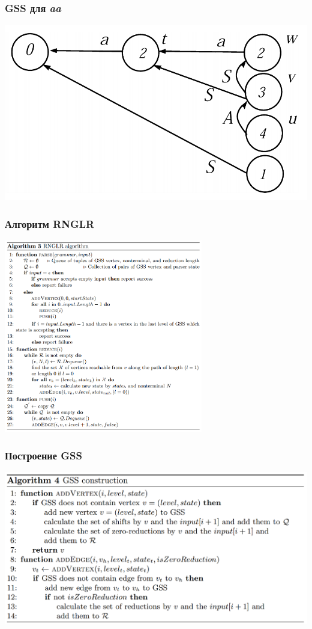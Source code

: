 \documentclass{beamer}
\begin{document}
\begin{frame}[fragile]
  \transwipe[direction=90]
  \frametitle{GSS для \emph{aa}}
\begin{center}
  \includegraphics[width=1.0\textwidth]{pics/6}
\end{center}                                      
\end{frame}

\begin{frame}[fragile]
  \transwipe[direction=90]
  \frametitle{Алгоритм RNGLR}
\begin{center}
  \includegraphics[width=0.65\textwidth]{pics/7}
\end{center}                                      
\end{frame}

\begin{frame}[fragile]
  \transwipe[direction=90]
  \frametitle{Построение GSS}
\begin{center}
  \includegraphics[width=1.0\textwidth]{pics/8}
\end{center}                                      
\end{frame}
\end{document}
